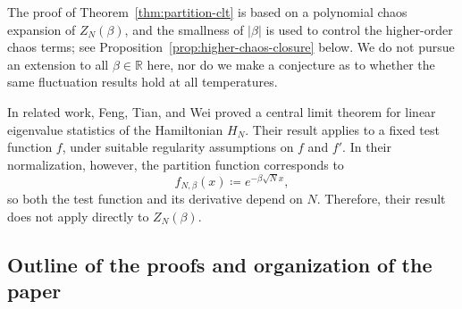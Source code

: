\documentclass[../CLT_SYK.tex]{subfiles}
\begin{document}
\begin{remark}
The proof of Theorem~\ref{thm:partition-clt} is based on a polynomial chaos expansion of $Z_N(\beta)$, and the smallness of $|\beta|$ is used to control the higher-order chaos terms; see Proposition~\ref{prop:higher-chaos-closure} below.
We do not pursue an extension to all $\beta\in\mathbb R$ here, nor do we make a conjecture as to whether the same fluctuation results hold at all temperatures.
\end{remark}

\begin{remark}
In related work, Feng, Tian, and Wei \cite{FTW2018} proved a central limit theorem for linear eigenvalue statistics of the Hamiltonian $H_N$. Their result applies to a fixed test function \(f\), under suitable regularity assumptions on \(f\) and \(f'\). In their normalization, however, the partition function corresponds to
\[
f_{N,\beta}(x) \coloneqq e^{-\beta \sqrt{N} x},
\]
so both the test function and its derivative depend on \(N\). Therefore, their result does not apply directly to \(Z_N(\beta)\).
\end{remark}


\subsection{Outline of the proofs and organization of the paper}
\end{document}
